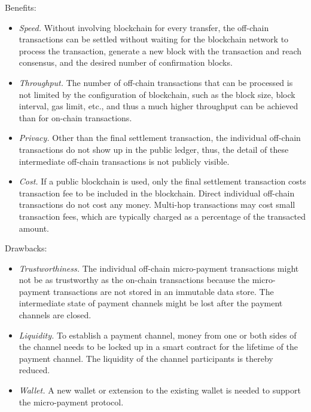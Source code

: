 Benefits:
\begin{itemize}
  \item \textit{Speed.} Without involving blockchain for every transfer, the off-chain transactions can be settled without waiting for the blockchain network to process the transaction, generate a new block with the transaction and reach consensus, and the desired number of confirmation blocks.
  \item \textit{Throughput.} The number of off-chain transactions that can be processed is not limited by the configuration of blockchain, such as the block size, block interval, gas limit, etc., and thus a much higher throughput can be achieved than for on-chain transactions.
  \item \textit{Privacy.} Other than the final settlement transaction, the individual off-chain transactions do not show up in the public ledger, thus, the detail of these intermediate off-chain transactions is not publicly visible.
  \item \textit{Cost.} If a public blockchain is used, only the final settlement transaction costs transaction fee to be included in the blockchain. Direct individual off-chain transactions do not cost any money. Multi-hop transactions may cost small transaction fees, which are typically charged as a percentage of the transacted amount.
\end{itemize}

Drawbacks: 
\begin{itemize}
   \item \textit{Trustworthiness.} The individual off-chain micro-payment transactions might not be as trustworthy as the on-chain transactions because the micro-payment transactions are not stored in an immutable data store. The intermediate state of payment channels might be lost after the payment channels are closed. %
   \item \textit{Liquidity.} To establish a payment channel, money from one or both sides of the channel needs to be locked up in a smart contract for the lifetime of the payment channel. The liquidity of the channel participants is thereby reduced.
   \item \textit{Wallet.} A new wallet or extension to the existing wallet is needed to support the micro-payment protocol.
\end{itemize}

